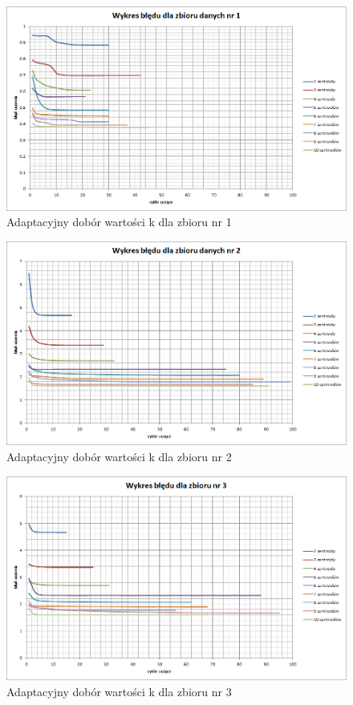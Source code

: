 \documentclass{classrep}
\begin{document}
\par

\begin{figure}[h]
	\centering
		\includegraphics[scale=0.55]{pictures/183566_kmeans_1.png}
	\caption{Adaptacyjny dobór wartości k dla zbioru nr 1}
	\label{fig:183566_kmeans_1}
\end{figure}


\begin{figure}[h]
\centering
			\includegraphics[scale=0.55]{pictures/183566_kmeans_2.png}
	\caption{Adaptacyjny dobór wartości k dla zbioru nr 2}
	\label{fig:183566_kmeans_2}
\end{figure}

\clearpage

\begin{figure}[h]
\centering
			\includegraphics[scale=0.55]{pictures/183566_kmeans_3.png}
	\caption{Adaptacyjny dobór wartości k dla zbioru nr 3}
	\label{fig:183566_kmeans_3}
\end{figure}
\end{document}
